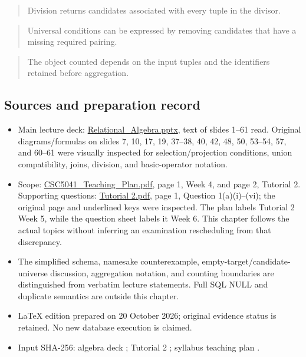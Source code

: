 \begin{quote}
Division returns candidates associated with every tuple in the divisor.
\end{quote}

\begin{quote}
Universal conditions can be expressed by removing candidates that have a missing required pairing.
\end{quote}

\begin{quote}
The object counted depends on the input tuples and the identifiers retained before aggregation.
\end{quote}

\subsection{Sources and preparation record}\label{05_relational_algebra_en-sources-and-preparation-record}

\begin{itemize}
\tightlist
\item
  Main lecture deck: \href{../../../slides/Relational_Algebra.pptx}{Relational\_Algebra.pptx}, text of slides 1--61 read. Original diagrams/formulas on slides 7, 10, 17, 19, 37--38, 40, 42, 48, 50, 53--54, 57, and 60--61 were visually inspected for selection/projection conditions, union compatibility, joins, division, and basic-operator notation.
\item
  Scope: \href{../../../syllabus/CSC5041_Teaching_Plan.pdf}{CSC5041\_Teaching\_Plan.pdf}, page 1, Week 4, and page 2, Tutorial 2. Supporting questions: \href{../../../slides/Tutorial\%202.pdf}{Tutorial 2.pdf}, page 1, Question 1(a)(i)--(vi); the original page and underlined keys were inspected. The plan labels Tutorial 2 Week 5, while the question sheet labels it Week 6. This chapter follows the actual topics without inferring an examination rescheduling from that discrepancy.
\item
  The simplified schema, namesake counterexample, empty-target/candidate-universe discussion, aggregation notation, and counting boundaries are distinguished from verbatim lecture statements. Full SQL NULL and duplicate semantics are outside this chapter.
\item
  LaTeX edition prepared on 20 October 2026; original evidence status is retained. No new database execution is claimed.
\item
  Input SHA-256: algebra deck \texttt{}; Tutorial 2 \texttt{}; syllabus teaching plan \texttt{}.
\end{itemize}
